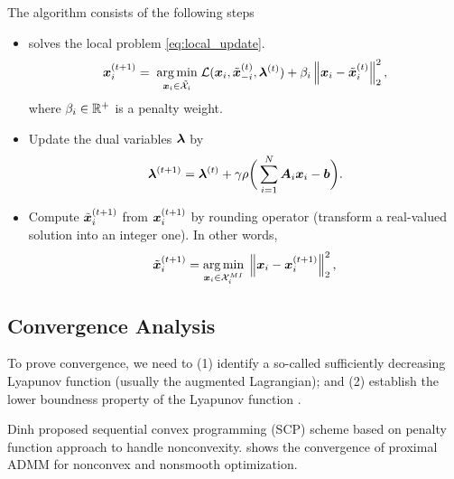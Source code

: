 \documentclass[twocolumn,amsthm]{autart}%
\theoremstyle{definition}
\theoremstyle{plain}
\begin{document}
The algorithm consists of the following steps
\begin{itemize}
\item {} solves the local problem \eqref{eq:local_update}.
\begin{equation}
\label{eq:local_update}
\boldsymbol{x}_i^{(t+1)} = \; \underset{\boldsymbol{x}_i \in \tilde{\mathcal{X}}_i}{\operatorname*{arg\,min}}  \; \mathcal{L} (\boldsymbol{x}_i, \tilde{\boldsymbol{x}}_{-i}^{(t)}, \boldsymbol{\lambda}^{(t)}) + \beta_i \left\lVert \boldsymbol{x}_i - \tilde{\boldsymbol{x}}_i^{(t)} \right\rVert_2^2,
\end{equation}
where $\beta_i \in \mathbb{R}^{+}$ is a penalty weight.

\item Update the dual variables $\boldsymbol{\lambda}$ by 
\begin{equation}
\boldsymbol{\lambda}^{(t+1)} = \boldsymbol{\lambda}^{(t)} + \gamma \rho \bigg( \sum_{i=1}^{N} \boldsymbol{A}_{i} \boldsymbol{x}_i - \boldsymbol{b} \bigg).
\end{equation}


\item Compute $\tilde{\boldsymbol{x}}_i^{(t+1)}$ from $\boldsymbol{x}_i^{(t+1)}$ by rounding operator (transform a real-valued solution into an integer one). 
In other words,
\begin{equation}
\tilde{\boldsymbol{x}}_i^{(t+1)} = \underset{\boldsymbol{x}_i \in \mathcal{X}_i^{\relax{MI}}}{\operatorname*{arg\,min}} \;
\left\lVert \boldsymbol{x}_i - \boldsymbol{x}_i^{(t+1)} \right\rVert_2^2,
\end{equation}
\end{itemize}


\subsection{Convergence Analysis}

To prove convergence, we need to (1) identify a so-called sufficiently decreasing Lyapunov function (usually the augmented Lagrangian); and (2) establish the lower boundness property of the Lyapunov function \cite{yang2022proximal}.

Dinh \etal \cite{dinh2013dual} proposed sequential convex programming (SCP) scheme based on penalty function approach to handle nonconvexity.
\cite{yang2022proximal} shows the convergence of proximal ADMM for nonconvex and nonsmooth optimization.
\end{document}
